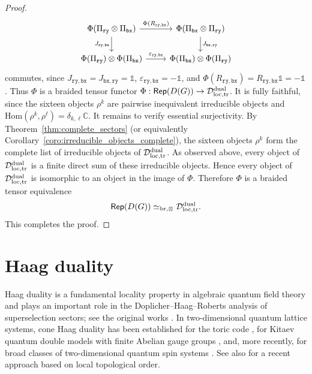 \documentclass[a4paper,11pt]{article}
\theoremstyle{definition}
\theoremstyle{remark}
\theoremstyle{remark}
\newcommand\Rep {\mathsf{Rep}}
\newcommand\Hom {\mathrm{Hom}}
\begin{document}
\begin{proof}
\begin{equation*}
        \begin{tikzcd}
        	{\Phi(\Pi_{\mathtt{ry}}\otimes\Pi_{\mathtt{bx}})} & {\Phi(\Pi_{\mathtt{bx}}\otimes\Pi_{\mathtt{ry}})} \\
        	{\Phi(\Pi_{\mathtt{ry}})\otimes \Phi(\Pi_{\mathtt{bx}})} & {\Phi(\Pi_{\mathtt{bx}})\otimes\Phi(\Pi_{\mathtt{ry}})}
        	\arrow["{\Phi(R_{\mathtt{ry},\mathtt{bx}})}", from=1-1, to=1-2]
        	\arrow["{J_{\mathtt{ry},\mathtt{bx}}}"', from=1-1, to=2-1]
        	\arrow["{J_{\mathtt{bx},\mathtt{ry}}}", from=1-2, to=2-2]
        	\arrow["{\varepsilon_{\mathtt{ry},\mathtt{bx}}}", from=2-1, to=2-2]
        \end{tikzcd}
    \end{equation*}
    commutes, since $J_{\mathtt{ry},\mathtt{bx}} = J_{\mathtt{bx},\mathtt{ry}} = \mathds{1}$, $\varepsilon_{\mathtt{ry},\mathtt{bx}} = -\mathds{1}$, and $\Phi(R_{\mathtt{ry},\mathtt{bx}}) = R_{\mathtt{ry},\mathtt{bx}}\mathds{1} = -\mathds{1}$. 
    Thus $\Phi$ is a braided tensor functor $\Phi:\Rep(D(G)) \to \mathcal D_{\rm loc,tr}^{\rm dual}$. It is fully faithful, since the sixteen objects $\rho^k$ are pairwise inequivalent irreducible objects and $\Hom(\rho^k,\rho^\ell) = \delta_{k,\ell}\mathbb C$. It remains to verify essential surjectivity. By Theorem~\ref{thm:complete_sectors} (or equivalently Corollary~\ref{coro:irreducible_objects_complete}), the sixteen objects $\rho^k$ form the complete list of irreducible objects of $\mathcal D_{\rm loc,tr}^{\rm dual}$. As observed above, every object of $\mathcal D_{\rm loc,tr}^{\rm dual}$ is a finite direct sum of these irreducible objects. Hence every object of $\mathcal D_{\rm loc,tr}^{\rm dual}$ is isomorphic to an object in the image of $\Phi$. Therefore $\Phi$ is a braided tensor equivalence
    \[
        \Rep(D(G)) \simeq_{\rm br,\otimes} \mathcal D_{\rm loc,tr}^{\rm dual}.
    \]
    This completes the proof. 
\end{proof}





\section{Haag duality} \label{sec:haag_duality}

Haag duality is a fundamental locality property in algebraic quantum field theory and plays an important role in the Doplicher--Haag--Roberts analysis of superselection sectors; see the original works \cite{doplicher1971local,doplicher1974local}. In two-dimensional quantum lattice systems, cone Haag duality has been established for the toric code \cite{naaijkens2012haag}, for Kitaev quantum double models with finite Abelian gauge groups \cite{fiedler2015haag}, and, more recently, for broad classes of two-dimensional quantum spin systems \cite{ogata2025haag}. See also \cite{naaijkens2026local} for a recent approach based on local topological order.
\end{document}
